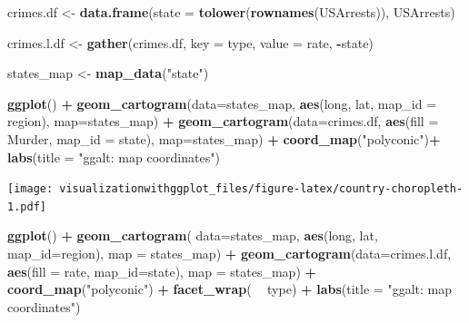 \documentclass[]{krantz}
\makeatletter
\newenvironment{Shaded}{\begin{snugshade}}{\end{snugshade}}
\newcommand{\DataTypeTok}[1]{\textcolor[rgb]{0.13,0.29,0.53}{#1}}
\newcommand{\KeywordTok}[1]{\textcolor[rgb]{0.13,0.29,0.53}{\textbf{#1}}}
\newcommand{\NormalTok}[1]{#1}
\newcommand{\OperatorTok}[1]{\textcolor[rgb]{0.81,0.36,0.00}{\textbf{#1}}}
\newcommand{\StringTok}[1]{\textcolor[rgb]{0.31,0.60,0.02}{#1}}
\newenvironment{kframe}{%
\medskip{}
\setlength{\fboxsep}{.8em}
 \def\at@end@of@kframe{}%
 \ifinner\ifhmode%
  \def\at@end@of@kframe{\end{minipage}}%
  \begin{minipage}{\columnwidth}%
 \fi\fi%
 \def\FrameCommand##1{\hskip\@totalleftmargin \hskip-\fboxsep
 \colorbox{shadecolor}{##1}\hskip-\fboxsep
     \hskip-\linewidth \hskip-\@totalleftmargin \hskip\columnwidth}%
 \MakeFramed {\advance\hsize-\width
   \@totalleftmargin\z@ \linewidth\hsize
   \@setminipage}}%
 {\par\unskip\endMakeFramed%
 \at@end@of@kframe}
\renewenvironment{Shaded}{\begin{kframe}}{\end{kframe}}
\makeatother
\begin{document}
\begin{Shaded}
\begin{Highlighting}[]
\NormalTok{crimes.df <-}\StringTok{ }\KeywordTok{data.frame}\NormalTok{(}\DataTypeTok{state =} \KeywordTok{tolower}\NormalTok{(}\KeywordTok{rownames}\NormalTok{(USArrests)), USArrests)}

\NormalTok{crimes.l.df <-}\StringTok{ }\KeywordTok{gather}\NormalTok{(crimes.df, }\DataTypeTok{key =}\NormalTok{ type, }\DataTypeTok{value =}\NormalTok{ rate, }\OperatorTok{-}\NormalTok{state)}

\NormalTok{states_map <-}\StringTok{ }\KeywordTok{map_data}\NormalTok{(}\StringTok{"state"}\NormalTok{)}

\KeywordTok{ggplot}\NormalTok{() }\OperatorTok{+}
\StringTok{    }\KeywordTok{geom_cartogram}\NormalTok{(}\DataTypeTok{data=}\NormalTok{states_map, }\KeywordTok{aes}\NormalTok{(long, lat, }\DataTypeTok{map_id =}\NormalTok{ region), }\DataTypeTok{map=}\NormalTok{states_map) }\OperatorTok{+}
\StringTok{    }\KeywordTok{geom_cartogram}\NormalTok{(}\DataTypeTok{data=}\NormalTok{crimes.df, }\KeywordTok{aes}\NormalTok{(}\DataTypeTok{fill =}\NormalTok{ Murder, }\DataTypeTok{map_id =}\NormalTok{ state), }\DataTypeTok{map=}\NormalTok{states_map) }\OperatorTok{+}\StringTok{ }
\StringTok{    }\KeywordTok{coord_map}\NormalTok{(}\StringTok{"polyconic"}\NormalTok{)}\OperatorTok{+}
\StringTok{    }\KeywordTok{labs}\NormalTok{(}\DataTypeTok{title =} \StringTok{"ggalt: map coordinates"}\NormalTok{)}
\end{Highlighting}
\end{Shaded}

\texttt{[image: visualizationwithggplot\_files/figure-latex/country-choropleth-1.pdf]}

\begin{Shaded}
\begin{Highlighting}[]
\KeywordTok{ggplot}\NormalTok{() }\OperatorTok{+}
\StringTok{    }\KeywordTok{geom_cartogram}\NormalTok{( }\DataTypeTok{data=}\NormalTok{states_map, }\KeywordTok{aes}\NormalTok{(long, lat, }\DataTypeTok{map_id=}\NormalTok{region), }\DataTypeTok{map =}\NormalTok{ states_map) }\OperatorTok{+}
\StringTok{    }\KeywordTok{geom_cartogram}\NormalTok{(}\DataTypeTok{data=}\NormalTok{crimes.l.df, }\KeywordTok{aes}\NormalTok{(}\DataTypeTok{fill =}\NormalTok{ rate, }\DataTypeTok{map_id=}\NormalTok{state), }\DataTypeTok{map =}\NormalTok{ states_map) }\OperatorTok{+}
\StringTok{    }\KeywordTok{coord_map}\NormalTok{(}\StringTok{"polyconic"}\NormalTok{) }\OperatorTok{+}
\StringTok{    }\KeywordTok{facet_wrap}\NormalTok{( }\OperatorTok{~}\StringTok{ }\NormalTok{type) }\OperatorTok{+}
\StringTok{    }\KeywordTok{labs}\NormalTok{(}\DataTypeTok{title =} \StringTok{"ggalt: map coordinates"}\NormalTok{)}
\end{Highlighting}
\end{Shaded}
\end{document}
